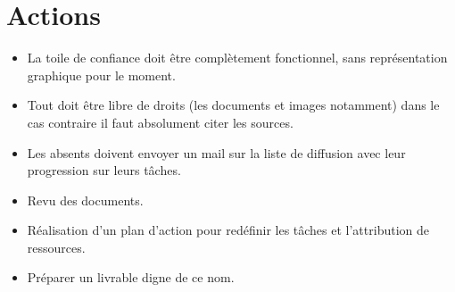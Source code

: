 \documentclass{CR-projet}
\begin{document}
\section{Actions}

\begin{itemize}
	\item La toile de confiance doit être complètement fonctionnel,
	sans représentation graphique pour le moment.
	\item Tout doit être libre de droits (les documents et images notamment) dans le cas contraire il faut 
	absolument citer les sources.
	\item Les absents doivent envoyer un mail sur la liste de diffusion avec leur progression sur leurs tâches.
	\item Revu des documents.
	\item Réalisation d'un plan d'action pour redéfinir les tâches et l'attribution de ressources.
	\item Préparer un livrable digne de ce nom.
\end{itemize}
\end{document}
